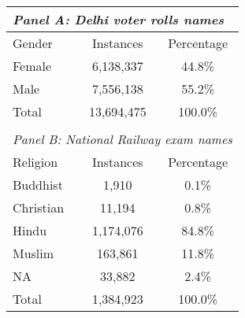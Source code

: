 {
\def\sym#1{\ifmmode^{#1}\else\(^{#1}\)\fi}
\begin{tabular}{l*{2}{c}}
\hline\hline
\multicolumn{3}{l}{\textit{Panel A: Delhi voter rolls names}}\\
\hline
Gender&\multicolumn{1}{c}{Instances}&\multicolumn{1}{c}{Percentage}\\
\hline
Female&6,138,337&44.8\% \\
Male&7,556,138&55.2\% \\
\hline
Total&13,694,475&100.0\% \\
\hline
&&\\
\hline\hline
\multicolumn{3}{l}{\textit{Panel B: National Railway exam names}}\\
\hline
Religion&\multicolumn{1}{c}{Instances}&\multicolumn{1}{c}{Percentage}\\
\hline
Buddhist&1,910&0.1\% \\
Christian&11,194&0.8\% \\
Hindu&1,174,076&84.8\% \\
Muslim&163,861&11.8\% \\
NA&33,882&2.4\% \\
\hline
Total&1,384,923&100.0\% \\
\hline
\end{tabular}
}

